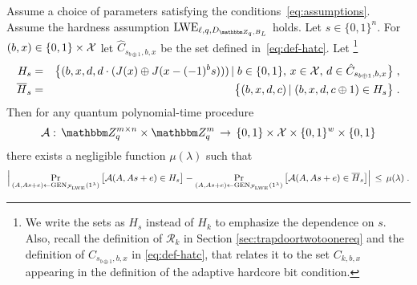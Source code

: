 \begin{lemma}\label{lem:lweadaptivehardcore} 
Assume a choice of parameters satisfying the conditions~\eqref{eq:assumptions}. Assume the hardness assumption $\lwe_{\ell,q,D_{\mZ_q,B_L}}$ holds. Let $s\in\{0,1\}^n$. For $(b,x)\in\{0,1\}\times\mathcal{X}$ let $ \hat{C}_{s_{b\oplus 1},b,x}$ be the set defined in~\eqref{eq:def-hatc}. Let \footnote{We write the sets as $H_s$ instead of $H_k$ to emphasize the dependence on $s$. Also, recall the definition of $\mathcal{R}_k$ in Section \ref{sec:trapdoortwotoonereq} and the definition of $\hat{C}_{s_{b\oplus 1},b,x}$ in \eqref{eq:def-hatc}, that relates it to the set $C_{k,b,x}$ appearing in the definition of the adaptive hardcore bit condition.}
\begin{eqnarray}
H_s &=& \big\{(b,x,d,d\cdot(\inj(x)\oplus \inj( x - (-1)^b \*s )))\,|\; b\in \{0,1\},\, x\in \sX,\, d\in \hat{C}_{s_{b\oplus 1},b,x}  \big\}\;,\label{eq:def-h}\\
\overline{H}_s &=& \big\{(b,x,d,c) \,|\; (b,x,d,c\oplus 1) \in H_s\big\}\;.
\end{eqnarray}
Then for any quantum polynomial-time procedure 
$$\mathcal{A}:\, \mZ_q^{m\times n} \times \mZ_q^m \,\to\,\{0,1\}\times \sX \times \{0,1\}^w \times\{0,1\}$$
 there exists a negligible function $\mu(\lambda)$ such that 
\begin{equation}\label{eq:lwebitattackeradvantage}
\Big|\Pr_{(\*A,\*A\*s+\*e)\leftarrow \textrm{GEN}_{\mathcal{F}_{\lwe}}(1^{\lambda})}\big[\mathcal{A}(\*A,\*A\*s+\*e) \in H_s\big] - \Pr_{(\*A,\*A\*s+\*e)\leftarrow \textrm{GEN}_{\mathcal{F}_{\lwe}}(1^{\lambda})}\big[\mathcal{A}(\*A,\*A\*s+\*e) \in \overline{H}_s\big]\Big| \,\leq\, \mu(\lambda)\;.
\end{equation} 
\end{lemma}

